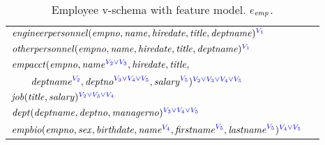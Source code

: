 \begin{table}
\caption[short caption]{Employee v-schema with feature model.
 \ensuremath{\dimMeta_\employee}.}
\vspace{-8pt}
\label{tab:emp-vsch}
\begin{center}
\small
\begin{tabular} {|l|l|}
\hline
\rule{0pt}{3ex}%
$\engemp(\empno, \name, \hiredate,\titleatt,\deptname)^{\textcolor{blue}
\vOne}$ \\[1.1ex]
$\othemp(\empno, \name, \hiredate, \titleatt, \deptname)^{\textcolor{blue}
\vOne}$ \\[1.1ex]
$\empacct(\empno, \annot [\textcolor{blue}{\vTwo \vee \vThree}] \name,
\hiredate, \titleatt,$ \\
$\qquad\annot[\textcolor{blue} \vTwo]\deptname, \annot
[\textcolor{blue} {\vThree \vee \vFour \vee \vFive}]\deptno,\annot
[\textcolor{blue} \vFive]\salary)^{\textcolor{blue}{\vTwo \vee \vThree \vee
\vFour \vee \vFive}}$ \\[1.1ex]
$\job(\titleatt, \salary)^{\textcolor{blue}{\vTwo \vee \vThree \vee \vFour}}$
\\[1.1ex]
$\dept(\deptname, \deptno, \managerno)^{\textcolor{blue}{\vThree \vee \vFour
\vee \vFive}}$ \\[1.1ex]
$\empbio(\empno, \sex, \birthdate, \annot [\textcolor{blue} \vFour] \name,
\annot[\textcolor{blue}\vFive]{\fname}, \annot[\textcolor{blue}
\vFive]{\lname})^{\textcolor{blue} {\vFour \vee \vFive}}$ \\
\hline
\end{tabular}
\vspace{-12pt}
\end{center}
\end{table}
